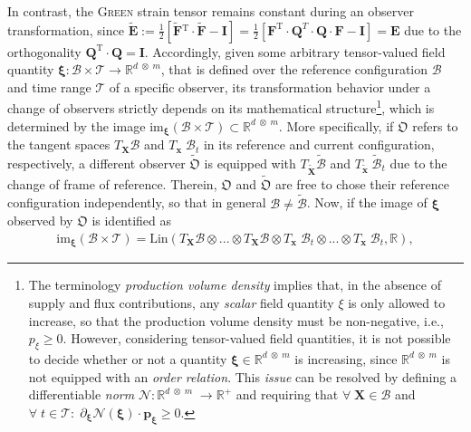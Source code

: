 In contrast, the \textsc{Green} strain tensor remains constant during an observer transformation, since $\tilde{\boldsymbol{E}}\!:=\!\frac{1}{2}[\tilde{\boldsymbol{F}}{^{\mathrm{T}}}\!\cdot\tilde{\boldsymbol{F}} - \boldsymbol{I}]\!=\!\frac{1}{2}[\boldsymbol{F}^{\mathrm{T}}\!\cdot\boldsymbol{Q}^{T}\!\!\cdot\boldsymbol{Q}\cdot\boldsymbol{F} - \boldsymbol{I}]\!=\!\boldsymbol{E}$ due to the orthogonality $\boldsymbol{Q}^{\mathrm{T}}\!\cdot\boldsymbol{Q}\!=\!\boldsymbol{I}$. Accordingly, given some arbitrary tensor-valued field quantity $\boldsymbol{\xi}\!:\mathcal{B}\times\mathcal{T}\to\mathbb{R}^{d\;\!\otimes\;\!m}$, that is defined over the reference configuration $\mathcal{B}$ and time range $\mathcal{T}$ of a specific observer, its transformation behavior under a change of observers strictly depends on its mathematical structure\footnote{The terminology \emph{production volume density} implies that, in the absence of supply and flux contributions, any \emph{scalar} field quantity $\xi$ is only allowed to increase, so that the production volume density must be non-negative, i.e., $p_{\xi}\!\geq\!0$. However, considering tensor-valued field quantities, it is not possible to decide whether or not a quantity $\boldsymbol{\xi}\!\in\!\mathbb{R}^{d\;\!\otimes\;\!m}$ is increasing, since $\mathbb{R}^{d\;\!\otimes\;\!m}$ is not equipped with an \emph{order relation}. This \emph{issue} can be resolved by defining a differentiable \emph{norm} $\mathcal{N}\!:\mathbb{R}^{d\;\!\otimes\;\!m}\;\!\to\mathbb{R}^{+}$ and requiring that $\forall\!\;\boldsymbol{X}\!\in\!\mathcal{B}$ and $\forall\;\!t\!\in\!\mathcal{T}\!:\;\!\partial_{\boldsymbol{\xi}}\mathcal{N}(\boldsymbol{\xi})\!\cdot\!\boldsymbol{p}_{\boldsymbol{\xi}}\!\geq\!0$.}, which is determined by the image $\mathrm{im}_{\boldsymbol{\xi}}(\mathcal{B}\times\mathcal{T})\subset\mathbb{R}^{d\;\!\otimes\;\!m}$. More specifically, if $\mathfrak{O}$ refers to the tangent spaces $T_{\boldsymbol{X}}\mathcal{B}$ and $T_{\boldsymbol{x}}\;\!\mathcal{B}_{t}$ in its reference and current configuration, respectively, a different observer $\tilde{\mathfrak{O}}$ is equipped with $T_{\tilde{\boldsymbol{X}}}\tilde{\mathcal{B}}$ and $T_{\tilde{\boldsymbol{x}}}\;\!\tilde{\mathcal{B}}_{t}$ due to the change of frame of reference. Therein, $\mathfrak{O}$ and $\tilde{\mathfrak{O}}$ are free to chose their reference configuration independently, so that in general $\mathcal{B}\!\neq\!\tilde{\mathcal{B}}$. Now, if the image of $\boldsymbol{\xi}$ observed by $\mathfrak{O}$ is identified as 
\begin{align}
	\mathrm{im}_{\boldsymbol{\xi}}(\mathcal{B}\times\mathcal{T})\!=\!\mathrm{Lin}(T_{\boldsymbol{X}}\mathcal{B}\otimes...\otimes T_{\boldsymbol{X}}\mathcal{B} \otimes T_{\boldsymbol{x}}\;\!\mathcal{B}_{t}\otimes ... \otimes T_{\boldsymbol{x}}\;\!\mathcal{B}_{t}, \mathbb{R}),
\end{align}
